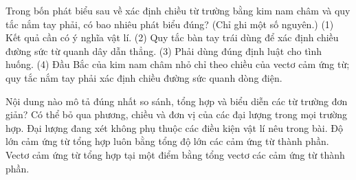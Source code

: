 \begin{ex}
Trong bốn phát biểu sau về xác định chiều từ trường bằng kim nam châm và quy tắc nắm tay phải, có bao nhiêu phát biểu đúng? (Chỉ ghi một số nguyên.) (1) Kết quả cần có ý nghĩa vật lí. (2) Quy tắc bàn tay trái dùng để xác định chiều đường sức từ quanh dây dẫn thẳng. (3) Phải dùng đúng định luật cho tình huống. (4) Đầu Bắc của kim nam châm nhỏ chỉ theo chiều của vectơ cảm ứng từ; quy tắc nắm tay phải xác định chiều đường sức quanh dòng điện.
\end{ex}

\begin{ex}
Nội dung nào mô tả đúng nhất so sánh, tổng hợp và biểu diễn các từ trường đơn giản?
\choice
{Có thể bỏ qua phương, chiều và đơn vị của các đại lượng trong mọi trường hợp.}
{Đại lượng đang xét không phụ thuộc các điều kiện vật lí nêu trong bài.}
{Độ lớn cảm ứng từ tổng hợp luôn bằng tổng độ lớn các cảm ứng từ thành phần.}
{\True Vectơ cảm ứng từ tổng hợp tại một điểm bằng tổng vectơ các cảm ứng từ thành phần.}
\end{ex}

